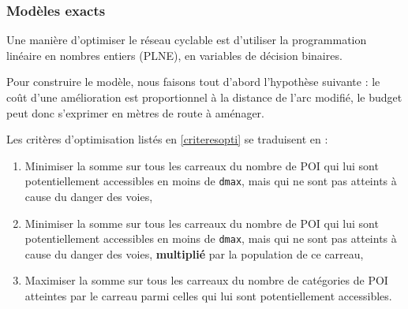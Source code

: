 \subsubsection{Modèles exacts} \label{modelesexacts}

Une manière d'optimiser le réseau cyclable est d'utiliser la programmation linéaire en nombres entiers (PLNE), en variables de décision binaires. 

Pour construire le modèle, nous faisons tout d'abord l'hypothèse suivante : le coût d'une amélioration est proportionnel à la distance de l'arc modifié, le budget peut donc s'exprimer en mètres de route à aménager.









Les critères d'optimisation listés en \ref{criteresopti} se traduisent en :

\begin{enumerate}
    \item Minimiser la somme sur tous les carreaux du nombre de POI qui lui sont potentiellement accessibles en moins de \texttt{dmax}, mais qui ne sont pas atteints à cause du danger des voies,
    \item Minimiser la somme sur tous les carreaux du nombre de POI qui lui sont potentiellement accessibles en moins de \texttt{dmax}, mais qui ne sont pas atteints à cause du danger des voies, \textbf{multiplié} par la population de ce carreau,
    \item Maximiser la somme sur tous les carreaux du nombre de catégories de POI atteintes par le carreau parmi celles qui lui sont potentiellement accessibles.
\end{enumerate}

